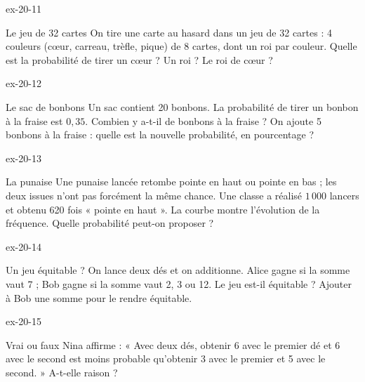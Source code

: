 \begin{blocLivre}{ex-20-11}\begin{exercice}[3]{Le jeu de 32 cartes}
On tire une carte au hasard dans un jeu de 32 cartes : 4 couleurs (cœur, carreau, trèfle, pique) de 8 cartes, dont un roi par couleur. Quelle est la probabilité de tirer un cœur ? Un roi ? Le roi de cœur ?
\end{exercice}\end{blocLivre}
\begin{blocLivre}{ex-20-12}\begin{exercice}[3]{Le sac de bonbons}
Un sac contient 20 bonbons. La probabilité de tirer un bonbon à la fraise est $0{,}35$. Combien y a-t-il de bonbons à la fraise ? On ajoute 5 bonbons à la fraise : quelle est la nouvelle probabilité, en pourcentage ?
\end{exercice}\end{blocLivre}
\begin{blocLivre}{ex-20-13}\begin{exercice}[3]{La punaise}
Une punaise lancée retombe pointe en haut ou pointe en bas ; les deux issues n’ont pas forcément la même chance. Une classe a réalisé $1\,000$ lancers et obtenu 620 fois « pointe en haut ». La courbe montre l’évolution de la fréquence. Quelle probabilité peut-on proposer ?
\label{fig-ex-20-13}
\end{exercice}\end{blocLivre}
\begin{blocLivre}{ex-20-14}\begin{exercice}[3]{Un jeu équitable ?}
On lance deux dés et on additionne. Alice gagne si la somme vaut 7 ; Bob gagne si la somme vaut 2, 3 ou 12. Le jeu est-il équitable ? Ajouter à Bob une somme pour le rendre équitable.
\end{exercice}\end{blocLivre}
\begin{blocLivre}{ex-20-15}\begin{exercice}[3]{Vrai ou faux}
Nina affirme : « Avec deux dés, obtenir 6 avec le premier dé et 6 avec le second est moins probable qu’obtenir 3 avec le premier et 5 avec le second. » A-t-elle raison ?
\end{exercice}\end{blocLivre}

\clearpage
